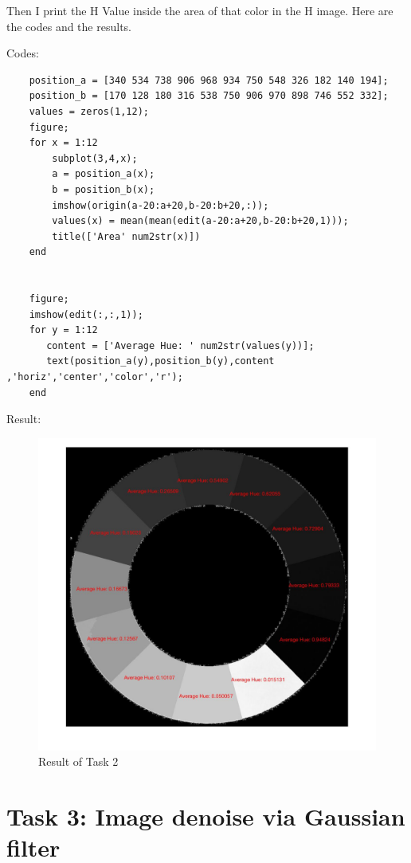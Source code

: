 \documentclass{article}
\begin{document}
Then I print the H Value inside the area of that color in the H image. Here are the codes and the results.

Codes:
\begin{lstlisting}
    position_a = [340 534 738 906 968 934 750 548 326 182 140 194];
    position_b = [170 128 180 316 538 750 906 970 898 746 552 332];
    values = zeros(1,12);
    figure;
    for x = 1:12
        subplot(3,4,x);
        a = position_a(x);
        b = position_b(x);
        imshow(origin(a-20:a+20,b-20:b+20,:));
        values(x) = mean(mean(edit(a-20:a+20,b-20:b+20,1)));
        title(['Area' num2str(x)])
    end
    
    
    figure;
    imshow(edit(:,:,1));
    for y = 1:12
       content = ['Average Hue: ' num2str(values(y))];
       text(position_a(y),position_b(y),content ,'horiz','center','color','r');
    end

\end{lstlisting}

Result:
\begin{figure}[htbp]
    \centering
    \includegraphics[scale = 0.15]{fig8.jpg}
    \caption{Result of Task 2}
    \label{fig8}
\end{figure}


\section{Task 3: Image denoise via Gaussian filter}
\end{document}
